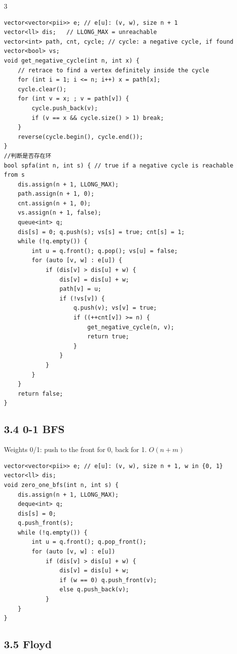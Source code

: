 \documentclass[8pt]{extarticle}
\begin{document}
\begin{multicols*}{3}
\begin{lstlisting}
vector<vector<pii>> e; // e[u]: (v, w), size n + 1
vector<ll> dis;   // LLONG_MAX = unreachable
vector<int> path, cnt, cycle; // cycle: a negative cycle, if found
vector<bool> vs;
void get_negative_cycle(int n, int x) {
    // retrace to find a vertex definitely inside the cycle
    for (int i = 1; i <= n; i++) x = path[x];
    cycle.clear();
    for (int v = x; ; v = path[v]) {
        cycle.push_back(v);
        if (v == x && cycle.size() > 1) break;
    }
    reverse(cycle.begin(), cycle.end());
}
//判断是否存在环
bool spfa(int n, int s) { // true if a negative cycle is reachable from s
    dis.assign(n + 1, LLONG_MAX);
    path.assign(n + 1, 0);
    cnt.assign(n + 1, 0);
    vs.assign(n + 1, false);
    queue<int> q;
    dis[s] = 0; q.push(s); vs[s] = true; cnt[s] = 1;
    while (!q.empty()) {
        int u = q.front(); q.pop(); vs[u] = false;
        for (auto [v, w] : e[u]) {
            if (dis[v] > dis[u] + w) {
                dis[v] = dis[u] + w;
                path[v] = u;
                if (!vs[v]) {
                    q.push(v); vs[v] = true;
                    if ((++cnt[v]) >= n) {
                        get_negative_cycle(n, v);
                        return true;
                    }
                }
            }
        }
    }
    return false;
}
\end{lstlisting}

\subsection*{3.4 0-1 BFS}

Weights 0/1: push to the front for 0, back for 1. $O(n + m)$

\begin{lstlisting}
vector<vector<pii>> e; // e[u]: (v, w), size n + 1, w in {0, 1}
vector<ll> dis;
void zero_one_bfs(int n, int s) {
    dis.assign(n + 1, LLONG_MAX);
    deque<int> q;
    dis[s] = 0;
    q.push_front(s);
    while (!q.empty()) {
        int u = q.front(); q.pop_front();
        for (auto [v, w] : e[u])
            if (dis[v] > dis[u] + w) {
                dis[v] = dis[u] + w;
                if (w == 0) q.push_front(v);
                else q.push_back(v);
            }
    }
}
\end{lstlisting}

\subsection*{3.5 Floyd}


\end{multicols*}
\end{document}
